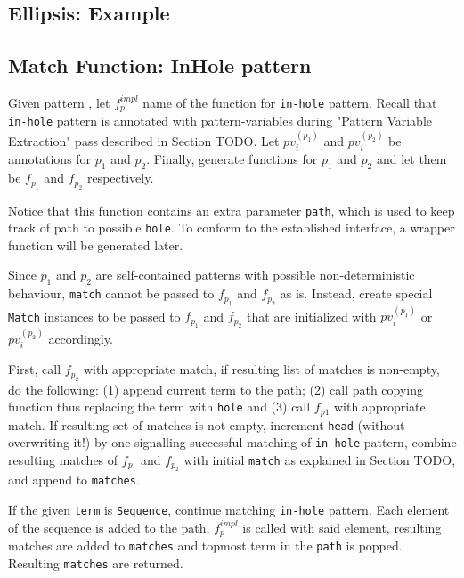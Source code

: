 \subsection{Ellipsis: Example}


\subsection{Match Function: InHole pattern}
Given pattern \InHolePattern, let $f_p^{impl}$ name of the function for \texttt{in-hole} pattern. Recall that \texttt{in-hole} pattern is annotated with pattern-variables during "Pattern Variable Extraction" pass described in Section TODO. Let $pv_i^{(p_1)}$ and $pv_i^{(p_2)}$ be annotations for $p_1$ and $p_2$. Finally, generate functions for $p_1$ and $p_2$ and let them be $f_{p_1}$ and $f_{p_2}$ respectively. 

Notice that this function contains an extra parameter \texttt{path}, which is used to keep track of path to possible \texttt{hole}. To conform to the established interface, a wrapper function will be generated later.

Since $p_1$ and $p_2$ are self-contained patterns with possible non-deterministic behaviour, \texttt{match} cannot be passed to $f_{p_1}$ and $f_{p_2}$ as is. Instead, create special \texttt{Match} instances to be passed to $f_{p_1}$ and $f_{p_2}$ that are initialized with $pv_i^{(p_1)}$ or $pv_i^{(p_2)}$ accordingly.

First, call $f_{p_2}$ with appropriate match, if resulting list of matches is non-empty, do the following: (1) append current term to the path; (2) call path copying function thus replacing the term with \texttt{hole} and (3) call $f_{p1}$ with appropriate match. If resulting set of matches is not empty, increment \texttt{head} (without overwriting it!) by one signalling successful matching of \texttt{in-hole} pattern, combine resulting matches of $f_{p_1}$ and $f_{p_2}$ with initial \texttt{match} as explained in Section TODO, and append to \texttt{matches}.

If the given \texttt{term} is \texttt{Sequence}, continue matching \texttt{in-hole} pattern. Each element of the sequence is added to the path, $f_p^{impl}$ is called with said element, resulting matches are added to \texttt{matches} and topmost term in the \texttt{path} is popped. Resulting \texttt{matches} are returned.

